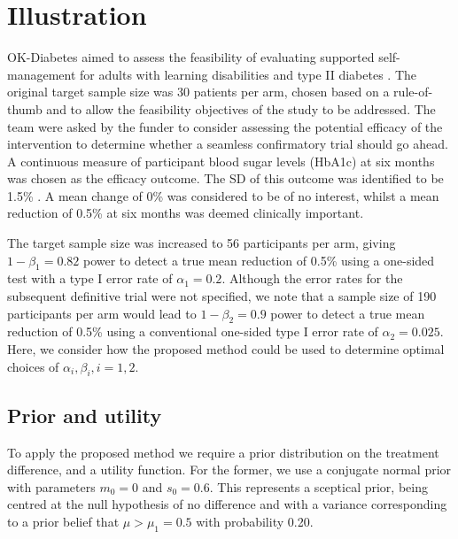 \documentclass[sagev, Crown]{sagej} %
\begin{document}
\section{Illustration}\label{sec:illustration}

OK-Diabetes aimed to assess the feasibility of evaluating supported self-management for adults with learning disabilities and type II diabetes \cite{Walwyn2015}. The original target sample size was 30 patients per arm, chosen based on a rule-of-thumb \cite{Lancaster2004} and to allow the feasibility objectives of the study to be addressed. The team were asked by the funder to consider assessing the potential efficacy of the intervention to determine whether a seamless confirmatory trial should go ahead. A continuous measure of participant blood sugar levels (HbA1c) at six months was chosen as the efficacy outcome. The SD of this outcome was identified to be 1.5\% \cite{OKD2013}. A mean change of 0\% was considered to be of no interest, whilst a mean reduction of 0.5\% at six months was deemed clinically important. 

The target sample size was increased to 56 participants per arm, giving $1-\beta_1 = 0.82$ power to detect a true mean reduction of 0.5\% using a one-sided test with a type I error rate of $\alpha_1 = 0.2$. Although the error rates for the subsequent definitive trial were not specified, we note that a sample size of 190 participants per arm would lead to $1-\beta_2 = 0.9$ power to detect a true mean reduction of 0.5\% using a conventional one-sided type I error rate of $\alpha_2 = 0.025$. Here, we consider how the proposed method could be used to determine optimal choices of $\alpha_i, \beta_i, i=1,2$.

\subsection{Prior and utility}

To apply the proposed method we require a prior distribution on the treatment difference, and a utility function. For the former, we use a conjugate normal prior with parameters $m_0 = 0$ and $s_0 = 0.6$. This represents a sceptical prior, being centred at the null hypothesis of no difference and with a variance corresponding to a prior belief that $\mu > \mu_1 = 0.5$ with probability 0.20.
\end{document}
